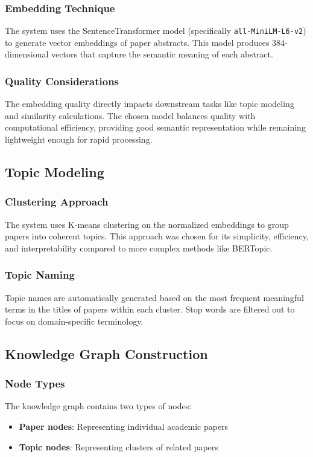 \documentclass[11pt,a4paper]{article}
\begin{document}
\subsubsection{Embedding Technique}
The system uses the SentenceTransformer model (specifically \texttt{all-MiniLM-L6-v2}) to generate vector embeddings of paper abstracts. This model produces 384-dimensional vectors that capture the semantic meaning of each abstract.

\subsubsection{Quality Considerations}
The embedding quality directly impacts downstream tasks like topic modeling and similarity calculations. The chosen model balances quality with computational efficiency, providing good semantic representation while remaining lightweight enough for rapid processing.

\subsection{Topic Modeling}

\subsubsection{Clustering Approach}
The system uses K-means clustering on the normalized embeddings to group papers into coherent topics. This approach was chosen for its simplicity, efficiency, and interpretability compared to more complex methods like BERTopic.

\subsubsection{Topic Naming}
Topic names are automatically generated based on the most frequent meaningful terms in the titles of papers within each cluster. Stop words are filtered out to focus on domain-specific terminology.

\subsection{Knowledge Graph Construction}

\subsubsection{Node Types}
The knowledge graph contains two types of nodes:
\begin{itemize}
    \item \textbf{Paper nodes}: Representing individual academic papers
    \item \textbf{Topic nodes}: Representing clusters of related papers
\end{itemize}
\end{document}
